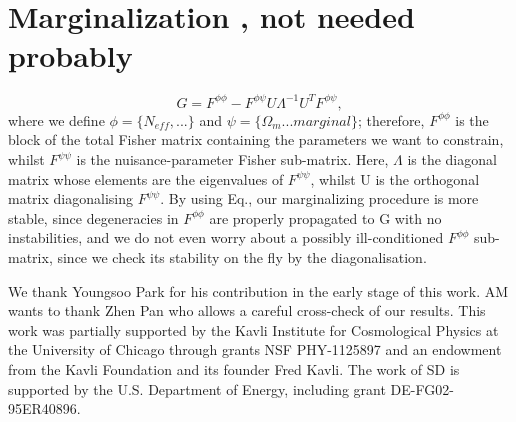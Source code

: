 \documentclass[aps,prd,reprint,superscriptaddress]{revtex4-1}
\begin{document}
\section{Marginalization , not needed probably}
\begin{equation}
G = F^{\phi\phi} - F^{\phi\psi}U\Lambda^{-1}U^{T}F^{\phi\psi},
\end{equation}
where we define $\phi = \{N_{eff},...\}$ and $\psi = \{\Omega_{m} ... marginal\}$; therefore, $F^{\phi\phi}$ is the block of the total Fisher matrix containing the parameters we want to constrain, whilst $F^{\psi\psi}$ is the nuisance-parameter Fisher sub-matrix. Here, $\Lambda$ is the diagonal matrix whose elements are the eigenvalues of $F^{\psi\psi}$, whilst U is the orthogonal matrix diagonalising $F^{\psi\psi}$. By using Eq., our marginalizing procedure is more stable, since degeneracies in $F^{\phi\phi}$ are properly propagated to G with no instabilities, and we do not even worry about a possibly ill-conditioned $F^{\phi\phi}$ sub-matrix, since we check its stability on the fly by the diagonalisation.

\begin{acknowledgments}
We thank Youngsoo Park for his contribution in the early stage of this work.
AM wants to thank Zhen Pan who allows a careful cross-check of our results.
This work was partially supported by the Kavli Institute for Cosmological Physics at the University of Chicago through grants NSF PHY-1125897 and an endowment from the Kavli Foundation and its founder Fred Kavli.
The work of SD is supported by the U.S. Department of Energy, including grant DE-FG02-95ER40896.
\end{acknowledgments}


\end{document}
